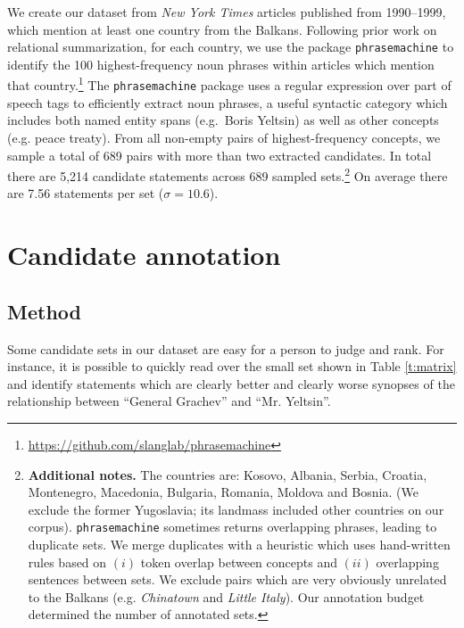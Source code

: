 \documentclass[11pt,a4paper]{article}
\begin{document}
We create our dataset from \textit{New York Times} articles \cite{SandhausNYT} published from 1990--1999, which mention at least one country from the Balkans. Following prior work on relational summarization, for each country, we use the package \texttt{phrasemachine} \cite{handler-etal-2016-bag} to identify the 100 highest-frequency noun phrases within articles which mention that country.\footnote{\url{https://github.com/slanglab/phrasemachine}} 
The \texttt{phrasemachine} package uses a regular expression over part of speech tags to efficiently extract noun phrases, a useful syntactic category which includes both named entity spans (e.g.\ Boris Yeltsin) as well as other concepts (e.g. peace treaty). From all non-empty pairs of highest-frequency concepts, we sample a total of 689 pairs with more than two extracted candidates. In total there are 5,214 candidate statements across 689 sampled sets.\footnote{\textbf{Additional notes.} The countries are: Kosovo, Albania, Serbia, Croatia, Montenegro, Macedonia, Bulgaria, Romania, Moldova and Bosnia. (We exclude the former Yugoslavia; its landmass included other countries on our corpus). \texttt{phrasemachine} sometimes returns overlapping phrases, leading to duplicate sets. We merge duplicates with a heuristic which uses hand-written rules based on $(i)$ token overlap between concepts and $(ii)$ overlapping sentences between sets. We exclude pairs which are very obviously unrelated to the Balkans (e.g. \textit{Chinatown} and \textit{Little Italy}). Our annotation budget determined the number of annotated sets.} On average there are 7.56 statements per set {\small($\sigma=10.6$)}.


\section{Candidate annotation}\label{s:annotation}

\subsection{Method}\label{s:method}

Some candidate sets in our dataset are easy for a person to judge and rank. For instance, it is possible to quickly read over the small set shown in Table \ref{t:matrix} and identify statements which are clearly better and clearly worse synopses of the relationship between ``General Grachev'' and ``Mr. Yeltsin''.
\end{document}
